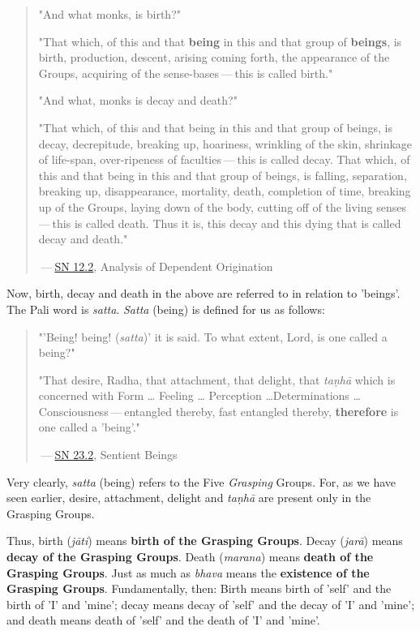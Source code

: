 \begin{quotation}
"And what monks, is birth?"


"That which, of this and that \textbf{being} in this and that group of
\textbf{beings}, is birth, production, descent, arising coming forth, the
appearance of the Groups, acquiring of the sense-bases — this is called
birth."


"And what, monks is decay and death?"


"That which, of this and that being in this and that group of beings, is
decay, decrepitude, breaking up, hoariness, wrinkling of the skin,
shrinkage of life-span, over-ripeness of faculties — this is called
decay. That which, of this and that being in this and that group of
beings, is falling, separation, breaking up, disappearance, mortality,
death, completion of time, breaking up of the Groups, laying down of the
body, cutting off of the living senses — this is called death. Thus it
is, this decay and this dying that is called decay and death."


 — \href{https://suttacentral.net/sn12.2/en/bodhi}{SN 12.2}, Analysis of Dependent Origination


\end{quotation}

Now, birth, decay and death in the above are referred to in relation to
'beings'. The Pali word is \emph{satta}. \emph{Satta} (being) is defined for us
as follows:


\begin{quotation}
"'Being! being! (\emph{satta})' it is said. To what extent, Lord, is one
called a being?"


"That desire, Radha, that attachment, that delight, that \emph{taṇhā} which
is concerned with Form …​ Feeling …​ Perception …​ Determinations …​
Consciousness — entangled thereby, fast entangled thereby, \textbf{therefore} is
one called a 'being'."


 — \href{https://suttacentral.net/sn23.2/en/sujato}{SN 23.2}, Sentient Beings


\end{quotation}

Very clearly, \emph{satta} (being) refers to the Five \emph{Grasping} Groups. For,
as we have seen earlier, desire, attachment, delight and \emph{taṇhā} are
present only in the Grasping Groups.


Thus, birth (\emph{jāti}) means \textbf{birth of the Grasping Groups}. Decay
(\emph{jarā}) means \textbf{decay of the Grasping Groups}. Death (\emph{marana})
means \textbf{death of the Grasping Groups}. Just as much as \emph{bhava} means
the \textbf{existence of the Grasping Groups}. Fundamentally, then: Birth
means birth of 'self' and the birth of 'I' and 'mine'; decay means decay
of 'self' and the decay of 'I' and 'mine'; and death means death of
'self' and the death of 'I' and 'mine'.


